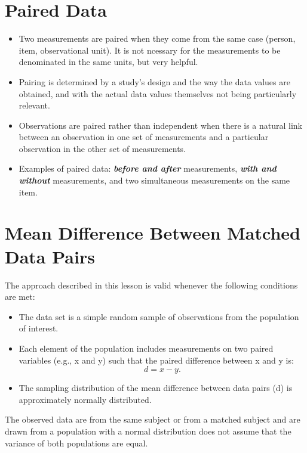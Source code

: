 \documentclass[a4paper,12pt]{article}
\begin{document}
\section*{Paired Data}
\begin{itemize}
\item Two measurements are paired when they come from the same case (person, item, observational unit). It is not ncessary for the measurements to be denominated in the same units, but very helpful.
\item Pairing is determined by a study's design and the way the data values are obtained, and with the actual data values themselves not being particularly relevant. 
\item Observations are paired rather than independent when there is a natural link between an observation in one set of measurements and a particular observation in the other set of measurements.
\item Examples of paired data: \textit{\textbf{before and after}} measurements,\textit{ \textbf{with and without}} measurements, and two simultaneous measurements on the same item.
\end{itemize}



\section*{Mean Difference Between Matched Data Pairs}
The approach described in this lesson is valid whenever the following
conditions are met:
\begin{itemize}
\item The data set is a simple random sample of observations from the
population of interest.
\item Each element of the population includes measurements on two paired
variables (e.g., x and y) such that the paired difference between x and y
is:
\[d = x-y.\]
\item The sampling distribution of the mean difference between data pairs (d)
is approximately normally distributed.
\end{itemize}
The observed data are from the same subject or from a matched subject and
are drawn from a population with a normal distribution does not assume that
the variance of both populations are equal.
\end{document}
